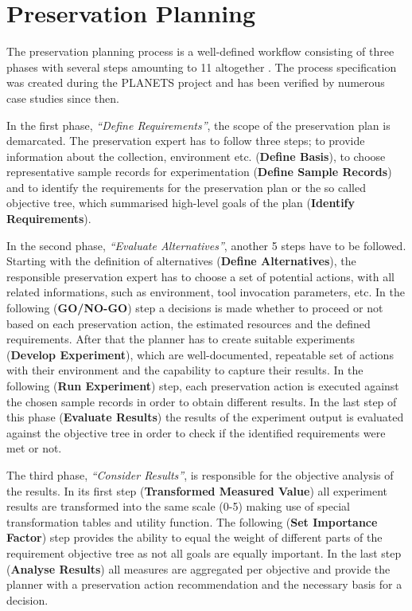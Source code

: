 \section{Preservation Planning}
\label{lbl:cp_preservationplanning}
The preservation planning process is a well-defined workflow consisting of three phases with several steps amounting to 11 altogether \cite{STR07_jcdl}. The process specification was created during the PLANETS project and has been verified by numerous case studies since then. 

In the first phase, \textit{``Define Requirements''}, the scope of the preservation plan is demarcated. The preservation expert has to follow three steps; to provide information about the collection, environment etc. (\textbf{Define Basis}), to choose representative sample records for experimentation (\textbf{Define Sample Records}) and to identify the requirements for the preservation plan or the so called objective tree, which summarised high-level goals of the plan (\textbf{Identify Requirements}). 

In the second phase, \textit{``Evaluate Alternatives''}, another 5 steps have to be followed. Starting with the definition of alternatives (\textbf{Define Alternatives}), the responsible preservation expert has to choose a set of potential actions, with all related informations, such as environment, tool invocation parameters, etc. In the following (\textbf{GO/NO-GO}) step a decisions is made whether to proceed or not based on each preservation action, the estimated resources and the defined requirements. After that the planner has to create suitable experiments (\textbf{Develop Experiment}), which are well-documented, repeatable set of actions with their environment and the capability to capture their results. In the following (\textbf{Run Experiment}) step, each preservation action is executed against the chosen sample records in order to obtain different results. In the last step of this phase (\textbf{Evaluate Results}) the results of the experiment output is evaluated against the objective tree in order to check if the identified requirements were met or not.

The third phase, \textit{``Consider Results''}, is responsible for the objective analysis of the results. In its first step (\textbf{Transformed Measured Value}) all experiment results are transformed into the same scale (0-5) making use of special transformation tables and utility function. The following (\textbf{Set Importance Factor}) step provides the ability to equal the weight of different parts of the requirement objective tree as not all goals are equally important. In the last step (\textbf{Analyse Results}) all measures are aggregated per objective and provide the planner with a preservation action recommendation and the necessary basis for a decision.

